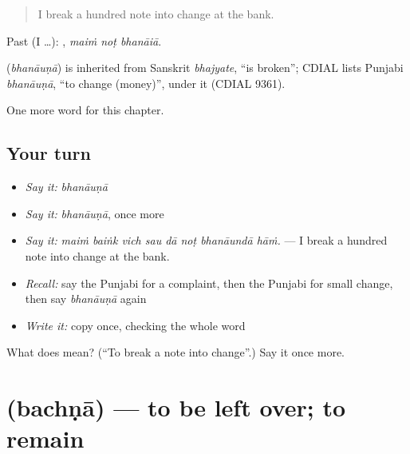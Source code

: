 \begin{quote}
I break a hundred note into change at the bank.
\end{quote}

Past (I …):   , \emph{maiṁ noṭ bhanāiā}.

\begin{cousinweb}
\textbf{} (\emph{bhanāuṇā}) is inherited from Sanskrit \emph{bhajyate}, \textquotedblleft{}is broken\textquotedblright{}; CDIAL lists Punjabi \emph{bhanāuṇā}, \textquotedblleft{}to change (money)\textquotedblright{}, under it (CDIAL 9361).
\end{cousinweb}

\begin{grammarlens}[title={What you've built}]
One more word for this chapter.
\end{grammarlens}

\subsection*{Your turn}
\begin{itemize}
\raggedright
  \item \emph{Say it:} \emph{bhanāuṇā}
  \item \emph{Say it:} \emph{bhanāuṇā}, once more
  \item \emph{Say it:} \emph{maiṁ baiṅk vich sau dā noṭ bhanāundā hāṁ.} — I break a hundred note into change at the bank.
  \item \emph{Recall:} say the Punjabi for a complaint, then the Punjabi for small change, then say \emph{bhanāuṇā} again
  \item \emph{Write it:} copy \textbf{} once, checking the whole word
\end{itemize}

\begin{tcolorbox}[breakable,colback=teal!4,colframe=teal!35!black,title={Before you move on}]
What does  mean? (\textquotedblleft{}To break a note into change\textquotedblright{}.) Say it once more.
\end{tcolorbox}
\section[\texorpdfstring{\pa{ਬਚਣਾ} (bachṇā)}{ਬਚਣਾ (bachṇā)}]{ (bachṇā) — to be left over; to remain}

\label{lesson:PA-C280-bachna}



